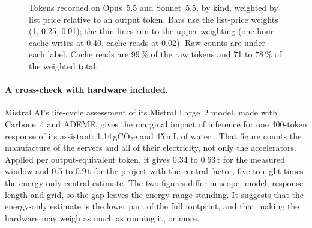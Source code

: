 \documentclass[11pt,a4paper]{article}
\begin{document}
\begin{figure}[h]\centering
{}
\caption{Tokens recorded on Opus~5.5 and Sonnet~5.5, by kind, weighted by list price relative to an output token. Bars use the list-price weights (1, 0.25, 0.01); the thin lines run to the upper weighting (one-hour cache writes at 0.40, cache reads at 0.02). Raw counts are under each label. Cache reads are 99\,\% of the raw tokens and 71 to 78\,\% of the weighted total.}\label{fig:tokens}
\end{figure}


\paragraph{A cross-check with hardware included.} Mistral AI's life-cycle assessment of its Mistral Large~2 model, made with Carbone~4 and ADEME, gives the marginal impact of inference for one 400-token response of its assistant: 1.14\,gCO$_2$e and 45\,mL of water \citep{mistral2025}. That figure counts the manufacture of the servers and all of their electricity, not only the accelerators. Applied per output-equivalent token, it gives 0.34 to 0.63\,t for the measured window and 0.5 to 0.9\,t for the project with the central factor, five to eight times the energy-only central estimate. The two figures differ in scope, model, response length and grid, so the gap leaves the energy range standing. It suggests that the energy-only estimate is the lower part of the full footprint, and that making the hardware may weigh as much as running it, or more.
\end{document}
